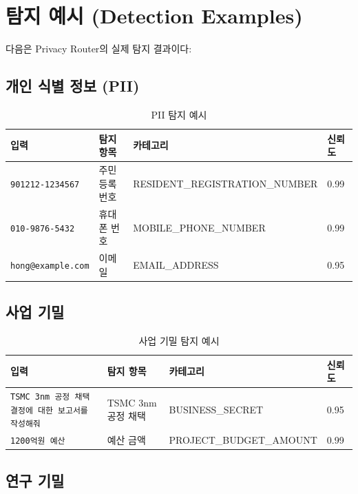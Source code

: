 \documentclass[11pt,a4paper]{article}
\begin{document}
\section{탐지 예시 (Detection Examples)}

다음은 Privacy Router의 실제 탐지 결과이다:

\subsection{개인 식별 정보 (PII)}

\begin{table}[h]
\centering
\begin{tabular}{@{}llll@{}}
\toprule
입력 & 탐지 항목 & 카테고리 & 신뢰도 \\
\midrule
\texttt{901212-1234567} & 주민등록번호 & RESIDENT\_REGISTRATION\_NUMBER & 0.99 \\
\texttt{010-9876-5432} & 휴대폰 번호 & MOBILE\_PHONE\_NUMBER & 0.99 \\
\texttt{hong@example.com} & 이메일 & EMAIL\_ADDRESS & 0.95 \\
\bottomrule
\end{tabular}
\caption{PII 탐지 예시}
\end{table}

\subsection{사업 기밀}

\begin{table}[h]
\centering
\begin{tabular}{@{}p{5cm}lll@{}}
\toprule
입력 & 탐지 항목 & 카테고리 & 신뢰도 \\
\midrule
\texttt{TSMC 3nm 공정 채택 결정에 대한 보고서를 작성해줘} & TSMC 3nm 공정 채택 & BUSINESS\_SECRET & 0.95 \\
\texttt{1200억원 예산} & 예산 금액 & PROJECT\_BUDGET\_AMOUNT & 0.99 \\
\bottomrule
\end{tabular}
\caption{사업 기밀 탐지 예시}
\end{table}

\subsection{연구 기밀}
\end{document}
